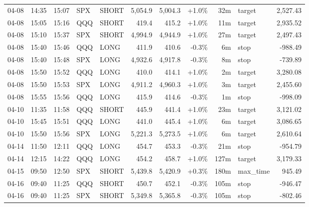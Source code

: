 \documentclass[11pt,a4paper,twoside]{article}
\begin{document}
\begin{center}
\begin{longtable}{>{\color{txtmain}}l l l l l r r r r >{\color{txtmain}}l r}
04-08 & 14:35 & 15:07 & SPX & SHORT & 5,054.9 & 5,004.3 & \textcolor{wingreen}{+1.0\%} & 32m & target & \textcolor{wingreen}{2,527.43} \\
04-08 & 15:05 & 15:16 & QQQ & SHORT & 419.4 & 415.2 & \textcolor{wingreen}{+1.0\%} & 11m & target & \textcolor{wingreen}{2,935.52} \\
04-08 & 15:10 & 15:37 & SPX & SHORT & 4,994.9 & 4,944.9 & \textcolor{wingreen}{+1.0\%} & 27m & target & \textcolor{wingreen}{2,497.43} \\
04-08 & 15:40 & 15:46 & QQQ & LONG & 411.9 & 410.6 & \textcolor{lossred}{-0.3\%} & 6m & stop & \textcolor{lossred}{-988.49} \\
04-08 & 15:40 & 15:48 & SPX & LONG & 4,932.6 & 4,917.8 & \textcolor{lossred}{-0.3\%} & 8m & stop & \textcolor{lossred}{-739.89} \\
04-08 & 15:50 & 15:52 & QQQ & LONG & 410.0 & 414.1 & \textcolor{wingreen}{+1.0\%} & 2m & target & \textcolor{wingreen}{3,280.08} \\
04-08 & 15:50 & 15:53 & SPX & LONG & 4,911.2 & 4,960.3 & \textcolor{wingreen}{+1.0\%} & 3m & target & \textcolor{wingreen}{2,455.60} \\
04-08 & 15:55 & 15:56 & QQQ & LONG & 415.9 & 414.6 & \textcolor{lossred}{-0.3\%} & 1m & stop & \textcolor{lossred}{-998.09} \\
04-10 & 11:35 & 11:58 & QQQ & SHORT & 445.9 & 441.4 & \textcolor{wingreen}{+1.0\%} & 23m & target & \textcolor{wingreen}{3,121.02} \\
04-10 & 15:45 & 15:51 & QQQ & LONG & 441.0 & 445.4 & \textcolor{wingreen}{+1.0\%} & 6m & target & \textcolor{wingreen}{3,086.65} \\
04-10 & 15:50 & 15:56 & SPX & LONG & 5,221.3 & 5,273.5 & \textcolor{wingreen}{+1.0\%} & 6m & target & \textcolor{wingreen}{2,610.64} \\
04-14 & 11:50 & 12:11 & QQQ & LONG & 454.7 & 453.3 & \textcolor{lossred}{-0.3\%} & 21m & stop & \textcolor{lossred}{-954.79} \\
04-14 & 12:15 & 14:22 & QQQ & LONG & 454.2 & 458.7 & \textcolor{wingreen}{+1.0\%} & 127m & target & \textcolor{wingreen}{3,179.33} \\
04-15 & 09:50 & 12:50 & SPX & SHORT & 5,439.8 & 5,420.9 & \textcolor{wingreen}{+0.3\%} & 180m & max\_time & \textcolor{wingreen}{945.49} \\
04-16 & 09:40 & 11:25 & QQQ & SHORT & 450.7 & 452.1 & \textcolor{lossred}{-0.3\%} & 105m & stop & \textcolor{lossred}{-946.47} \\
04-16 & 09:40 & 11:25 & SPX & SHORT & 5,349.8 & 5,365.8 & \textcolor{lossred}{-0.3\%} & 105m & stop & \textcolor{lossred}{-802.46} \\

\end{longtable}
\end{center}
\end{document}
